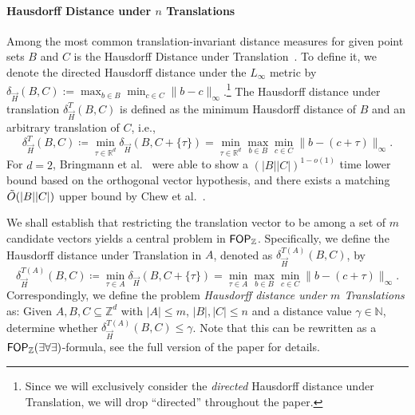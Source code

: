 \paragraph*{Hausdorff Distance under $n$ Translations}
Among the most common translation-invariant distance measures for given point sets $B$ and $C$ is the Hausdorff Distance under Translation~\cite{chew1992improvements, DBLP:conf/compgeom/BringmannN21, DBLP:conf/compgeom/Chan23, DBLP:journals/dcg/ChewDEK99, Nusser21, HuttenlocherK90}. 
To define it, we denote the directed Hausdorff distance under the $L_{\infty}$ metric by $\delta_{\overrightarrow{H}}(B,C):= \max_{ b \in B} \min_{c \in C} \|b-c\|_{\infty}$.\footnote{Since we will exclusively consider the \emph{directed} Hausdorff distance under Translation, we will drop ``directed'' throughout the paper.} The Hausdorff distance under translation $\delta_{\overrightarrow{H}}^T(B,C)$ is defined as the minimum Hausdorff distance of $B$ and an arbitrary translation of $C$, i.e.,
\[ \delta_{\overrightarrow{H}}^T(B,C) \coloneqq \min_{\tau \in \mathbb{R}^d} \delta_{\overrightarrow{H}}(B,C+\{\tau\}) = \min_{\tau \in \mathbb{R}^d} \max_{b\in B} \min_{c\in C} \|b-(c+\tau)\|_{\infty}.\]
For $d=2$, Bringmann et al.~\cite{DBLP:conf/compgeom/BringmannN21} were able to show a $(|B||C|)^{1-o(1)}$ time lower bound based on the orthogonal vector hypothesis, and there exists a matching $\Tilde{O}(|B||C|)$ upper bound by Chew et al.~\cite{ChewK92}.

We shall establish that restricting the translation vector to be among a set of $m$ candidate vectors yields a central problem in $\mathsf{FOP}_{\mathbb{Z}}$. Specifically, we define the Hausdorff distance under Translation in $A$, denoted as $\delta_{\overrightarrow{H}}^{T(A)}(B,C)$, by
 \[\delta_{\overrightarrow{H}}^{T(A)}(B,C) \coloneqq \min_{\tau \in A} \delta_{\overrightarrow{H}}(B,C+\{\tau\}) = \min_{\tau \in A} \max_{b\in B} \min_{c\in C} \|b-(c+\tau)\|_{\infty}.\]
Correspondingly, we define the problem \emph{Hausdorff distance under $m$ Translations} as: Given $A, B, C\subseteq \mathbb{Z}^d$ with $|A|\le m$, $|B|,|C| \le n$ and a distance value $\gamma \in \mathbb{N}$, determine whether $\delta_{\overrightarrow{H}}^{T(A)}(B,C) \le \gamma$.
Note that this can be rewritten as a $\mathsf{FOP}_{\mathbb{Z}}(\exists\forall\exists)$-formula, see the full version of the paper for details.

